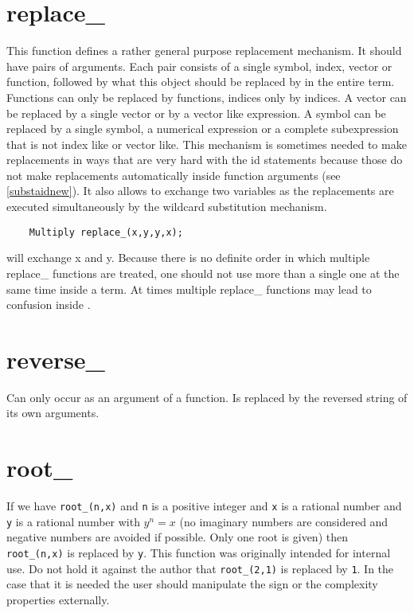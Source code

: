 \section{replace\_}
\label{funreplace}
\noindent This function defines a rather general purpose 
replacement mechanism. It should have pairs of 
arguments. Each pair consists of a single symbol, index, vector or 
function, followed by what this object should be replaced by in the entire 
term. Functions can only be replaced by functions, indices only by indices. 
A vector can be replaced by a single vector or by a vector like expression. 
A symbol can be replaced by a single symbol, a numerical expression or a 
complete subexpression that is not index like or vector like. This 
mechanism is sometimes needed to make replacements in ways that are very 
hard with the id statements because those do not make 
replacements automatically inside function arguments (see 
\ref{substaidnew}). It also allows to exchange two variables as the 
replacements are executed simultaneously by the wildcard substitution 
mechanism.
\begin{verbatim}
    Multiply replace_(x,y,y,x);
\end{verbatim}
will exchange x and y. Because there is no definite order in which multiple 
replace\_ functions are treated, one should not use more than a single one 
at the same time inside a term. At times multiple replace\_ functions may 
lead to confusion inside \FORM.

\section{reverse\_}
\label{funreverse}
\noindent Can only occur as an argument of a function. Is replaced 
by the reversed string of its own arguments.

\section{root\_}
\label{funroot}
\noindent If we have \verb:root_(n,x): and \verb:n: is a positive 
integer and \verb:x: is a rational number and \verb:y: is a rational number 
with $y^n = x$ (no imaginary numbers are considered and negative numbers 
are avoided if possible. Only one root is given) then \verb:root_(n,x): is 
replaced by \verb:y:. This function was originally intended for internal 
use. Do not hold it against the author that \verb:root_(2,1): is replaced 
by \verb:1:. In the case that it is needed the user should manipulate the 
sign or the complexity properties externally.

